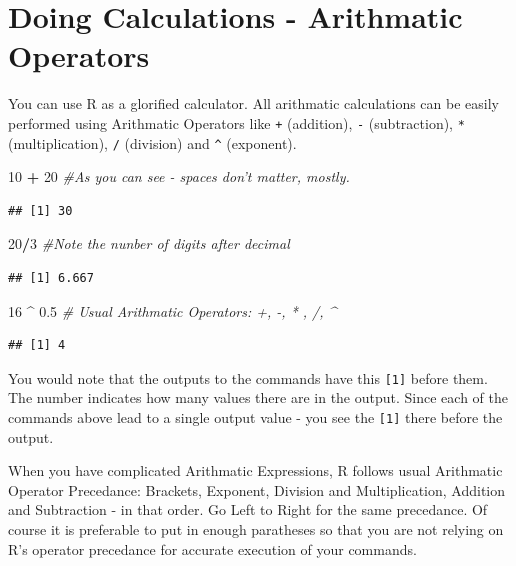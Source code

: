 \documentclass[]{krantz}
\makeatletter
\newenvironment{Shaded}{\begin{snugshade}}{\end{snugshade}}
\newcommand{\DecValTok}[1]{\textcolor[rgb]{0.06,0.06,0.06}{#1}}
\newcommand{\FloatTok}[1]{\textcolor[rgb]{0.06,0.06,0.06}{#1}}
\newcommand{\StringTok}[1]{\textcolor[rgb]{0.5,0.5,0.5}{#1}}
\newcommand{\CommentTok}[1]{\textcolor[rgb]{0.37,0.37,0.37}{\textit{#1}}}
\newcommand{\OperatorTok}[1]{\textcolor[rgb]{0.43,0.43,0.43}{\textbf{#1}}}
\newenvironment{kframe}{%
\medskip{}
\setlength{\fboxsep}{.8em}
 \def\at@end@of@kframe{}%
 \ifinner\ifhmode%
  \def\at@end@of@kframe{\end{minipage}}%
  \begin{minipage}{\columnwidth}%
 \fi\fi%
 \def\FrameCommand##1{\hskip\@totalleftmargin \hskip-\fboxsep
 \colorbox{shadecolor}{##1}\hskip-\fboxsep
     \hskip-\linewidth \hskip-\@totalleftmargin \hskip\columnwidth}%
 \MakeFramed {\advance\hsize-\width
   \@totalleftmargin\z@ \linewidth\hsize
   \@setminipage}}%
 {\par\unskip\endMakeFramed%
 \at@end@of@kframe}
\renewenvironment{Shaded}{\begin{kframe}}{\end{kframe}}
\makeatother
\begin{document}
\section{Doing Calculations - Arithmatic
Operators}\label{doing-calculations---arithmatic-operators}

You can use R as a glorified calculator. All arithmatic calculations can
be easily performed using Arithmatic Operators like \texttt{+}
(addition), \texttt{-} (subtraction), \texttt{*} (multiplication),
\texttt{/} (division) and \texttt{\^{}} (exponent).

\begin{Shaded}
\begin{Highlighting}[]
\DecValTok{10}  \OperatorTok{+}\StringTok{    }\DecValTok{20}  \CommentTok{#As you can see - spaces don't matter, mostly.}
\end{Highlighting}
\end{Shaded}

\begin{verbatim}
## [1] 30
\end{verbatim}

\begin{Shaded}
\begin{Highlighting}[]
\DecValTok{20}\OperatorTok{/}\DecValTok{3} \CommentTok{#Note the nunber of digits after decimal}
\end{Highlighting}
\end{Shaded}

\begin{verbatim}
## [1] 6.667
\end{verbatim}

\begin{Shaded}
\begin{Highlighting}[]
\DecValTok{16} \OperatorTok{^}\StringTok{ }\FloatTok{0.5}  \CommentTok{# Usual Arithmatic Operators: +, -, * , /, ^}
\end{Highlighting}
\end{Shaded}

\begin{verbatim}
## [1] 4
\end{verbatim}

You would note that the outputs to the commands have this
\texttt{{[}1{]}} before them. The number indicates how many values there
are in the output. Since each of the commands above lead to a single
output value - you see the \texttt{{[}1{]}} there before the output.

When you have complicated Arithmatic Expressions, R follows usual
Arithmatic Operator Precedance: Brackets, Exponent, Division and
Multiplication, Addition and Subtraction - in that order. Go Left to
Right for the same precedance. Of course it is preferable to put in
enough paratheses so that you are not relying on R's operator precedance
for accurate execution of your commands.
\end{document}

